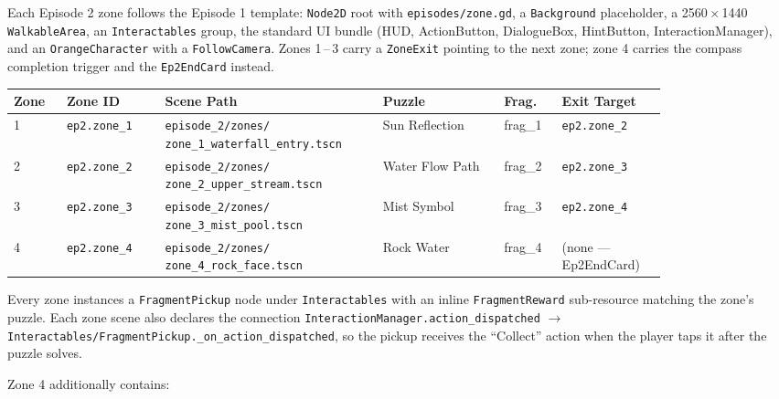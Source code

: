 \documentclass[12pt, a4paper]{article}
\begin{document}
Each Episode 2 zone follows the Episode 1 template: \texttt{Node2D} root
with \texttt{episodes/zone.gd}, a \texttt{Background} placeholder, a 2560\,$\times$\,1440
\texttt{WalkableArea}, an \texttt{Interactables} group, the standard UI bundle
(HUD, ActionButton, DialogueBox, HintButton, InteractionManager), and an
\texttt{OrangeCharacter} with a \texttt{FollowCamera}. Zones 1\,--\,3 carry a
\texttt{ZoneExit} pointing to the next zone; zone 4 carries the compass
completion trigger and the \texttt{Ep2EndCard} instead.

\begin{center}
\begin{longtable}{p{0.07\linewidth} p{0.13\linewidth} p{0.27\linewidth} p{0.16\linewidth} p{0.07\linewidth} p{0.13\linewidth}}
\toprule
\textbf{Zone} & \textbf{Zone ID} & \textbf{Scene Path} & \textbf{Puzzle} & \textbf{Frag.} & \textbf{Exit Target} \\
\midrule
\endfirsthead
\bottomrule
\endlastfoot

1 & \texttt{ep2.zone\_1} & \texttt{episode\_2/zones/} \texttt{zone\_1\_waterfall\_entry.tscn}
  & Sun Reflection  & frag\_1 & \texttt{ep2.zone\_2} \\

2 & \texttt{ep2.zone\_2} & \texttt{episode\_2/zones/} \texttt{zone\_2\_upper\_stream.tscn}
  & Water Flow Path & frag\_2 & \texttt{ep2.zone\_3} \\

3 & \texttt{ep2.zone\_3} & \texttt{episode\_2/zones/} \texttt{zone\_3\_mist\_pool.tscn}
  & Mist Symbol     & frag\_3 & \texttt{ep2.zone\_4} \\

4 & \texttt{ep2.zone\_4} & \texttt{episode\_2/zones/} \texttt{zone\_4\_rock\_face.tscn}
  & Rock Water      & frag\_4 & (none --- Ep2EndCard) \\

\end{longtable}
\end{center}

Every zone instances a \texttt{FragmentPickup} node under \texttt{Interactables}
with an inline \texttt{FragmentReward} sub-resource matching the zone's puzzle.
Each zone scene also declares the connection
\texttt{InteractionManager.action\_dispatched} $\to$
\texttt{Interactables/FragmentPickup.\_on\_action\_dispatched}, so the pickup
receives the ``Collect'' action when the player taps it after the puzzle solves.

Zone 4 additionally contains:
\end{document}
